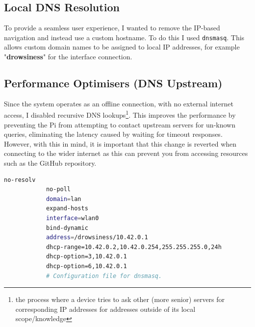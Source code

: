 \subsection{Local DNS Resolution}
To provide a seamless user experience, I wanted to remove the IP-based navigation and instead use a custom hostname. To do this
I used \texttt{dnsmasq}. This allows custom domain names to be assigned to local IP addresses, for example "\textbf{drowsiness}" for the
interface connection.
\subsection{Performance Optimisers (DNS Upstream)}
Since the system operates as an offline connection, with no external internet access, I disabled recursive DNS lookups\footnote{the
process where a device tries to ask other (more senior) servers for corresponding IP addresses for addresses outside of its local
scope/knowledge}.
This improves the performance by preventing the Pi from attempting to contact upstream servers for un-known queries, eliminating the
latency caused by waiting for timeout responses.
However, with this in mind, it is important that this change is reverted when connecting to the wider internet as this can prevent you
from accessing resources such as the GitHub repository.

\begin{minipage}{\textwidth} %
    \begin{mdframed}[style=takeawaybox]
        \begin{lstlisting}[language=bash, caption={dnsmasq Configuration}, captionpos=b]
            no-resolv
            no-poll
            domain=lan
            expand-hosts
            interface=wlan0
            bind-dynamic
            address=/drowsiness/10.42.0.1
            dhcp-range=10.42.0.2,10.42.0.254,255.255.255.0,24h
            dhcp-option=3,10.42.0.1
            dhcp-option=6,10.42.0.1
            # Configuration file for dnsmasq.
        \end{lstlisting}
    \end{mdframed}
\end{minipage}

